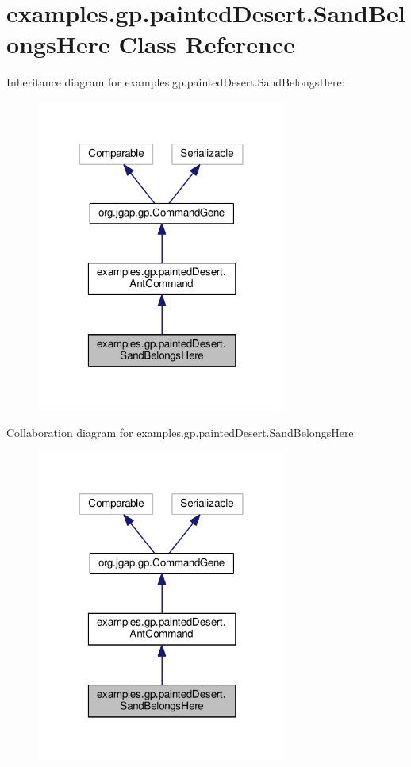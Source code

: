\hypertarget{classexamples_1_1gp_1_1painted_desert_1_1_sand_belongs_here}{\section{examples.\-gp.\-painted\-Desert.\-Sand\-Belongs\-Here Class Reference}
\label{classexamples_1_1gp_1_1painted_desert_1_1_sand_belongs_here}
}


Inheritance diagram for examples.\-gp.\-painted\-Desert.\-Sand\-Belongs\-Here\-:
\nopagebreak
\begin{figure}[H]
\begin{center}
\leavevmode
\includegraphics[width=233pt]{classexamples_1_1gp_1_1painted_desert_1_1_sand_belongs_here__inherit__graph}
\end{center}
\end{figure}


Collaboration diagram for examples.\-gp.\-painted\-Desert.\-Sand\-Belongs\-Here\-:
\nopagebreak
\begin{figure}[H]
\begin{center}
\leavevmode
\includegraphics[width=233pt]{classexamples_1_1gp_1_1painted_desert_1_1_sand_belongs_here__coll__graph}
\end{center}
\end{figure}
